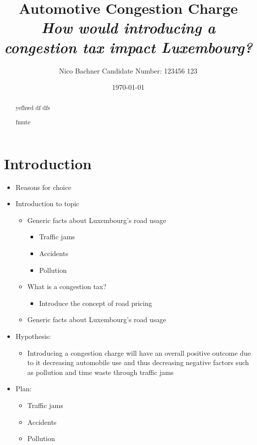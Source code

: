 \documentclass[
      a4paper,
        12pt,
          oneside,
      ]{article}
\title{
    \textbf{Automotive Congestion Charge}\\
    \emph{How would introducing a congestion tax impact Luxembourg?}
      }
\author{
          Nico Bachner \textbar{} Candidate Number: 123456 123
        }
\date{\today}
\providecommand{\tightlist}{
  \setlength{\itemsep}{0pt}
  \setlength{\parskip}{0pt}
}
\begin{document}
\maketitle
\thispagestyle{empty}

  \begin{abstract}
    yefhwd df dfs

    fmute
  \end{abstract}

      \setcounter{tocdepth}{4}
    \tableofcontents



\hypertarget{introduction}{%
\section{Introduction}\label{introduction}}

\begin{itemize}
\tightlist
\item
  Reasons for choice
\item
  Introduction to topic

  \begin{itemize}
  \tightlist
  \item
    Generic facts about Luxembourg's road usage

    \begin{itemize}
    \tightlist
    \item
      Traffic jams
    \item
      Accidents
    \item
      Pollution
    \end{itemize}
  \item
    What is a congestion tax?

    \begin{itemize}
    \tightlist
    \item
      Introduce the concept of road pricing
    \end{itemize}
  \item
    Generic facts about Luxembourg's road usage
  \end{itemize}
\item
  Hypothesis:

  \begin{itemize}
  \tightlist
  \item
    Introducing a congestion charge will have an overall positive
    outcome due to it decreasing automobile use and thus decreasing
    negative factors such as pollution and time waste through traffic
    jams
  \end{itemize}
\item
  Plan:

  \begin{itemize}
  \tightlist
  \item
    Traffic jams
  \item
    Accidents
  \item
    Pollution
  \end{itemize}
\end{itemize}
\end{document}
